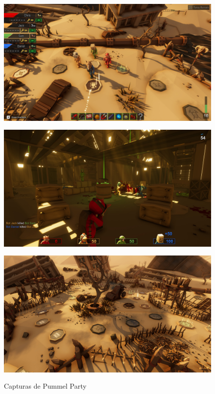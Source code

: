 \begin{figure}[H]
    \centering
    \begin{minipage}{0.40\textwidth}
        \centering
        \includegraphics[width=1.0\textwidth]{5-Cuerpo/Chapter3/PMP1.jpg} %
        \label{PMP-Tablero}
    \end{minipage}\hfill
    \begin{minipage}{0.40\textwidth}
        \centering
        \includegraphics[width=1.0\textwidth]{5-Cuerpo/Chapter3/PMP2.jpg} %
        \label{PMP-Shooter}
    \end{minipage}
    \centering
    \begin{minipage}{0.40\textwidth}
        \centering
        \includegraphics[width=1.0\textwidth]{5-Cuerpo/Chapter3/PMP3.jpg} %
        \label{PMP-Paisaje}
    \end{minipage}
    \caption{Capturas de Pummel Party}
\end{figure}
